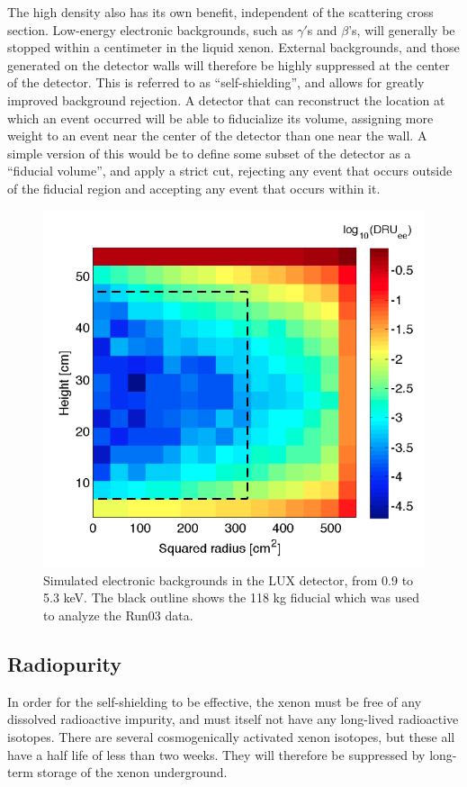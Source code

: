 The high density also has its own benefit, independent of the scattering cross section. Low-energy electronic backgrounds, such as $\gamma'$s and $\beta$'s, will generally be stopped within a centimeter in the liquid xenon. External backgrounds, and those generated on the detector walls will therefore be highly suppressed at the center of the detector. This is referred to as ``self-shielding'', and allows for greatly improved background rejection. A detector that can reconstruct the location at which an event occurred will be able to fiducialize its volume, assigning more weight to an event near the center of the detector than one near the wall. A simple version of this would be to define some subset of the detector as a ``fiducial volume'', and apply a strict cut, rejecting any event that occurs outside of the fiducial region and accepting any event that occurs within it.
\begin{figure}[h!]
\centering
\includegraphics[width=\linewidth]{Figures/lux_fiducial.png}
\caption{Simulated electronic backgrounds in the LUX detector, from 0.9 to 5.3 keV. The black outline shows the 118 kg fiducial which was used to analyze the Run03 data.\cite{lux_fiducial}}
\label{fig:lux_fiducial} 
\end{figure}

\clearpage
\subsection{Radiopurity}
In order for the self-shielding to be effective, the xenon must be free of any dissolved radioactive impurity, and must itself not have any long-lived radioactive isotopes. There are several cosmogenically activated xenon isotopes, but these all have a half life of less than two weeks. They will therefore be suppressed by long-term storage of the xenon underground.

